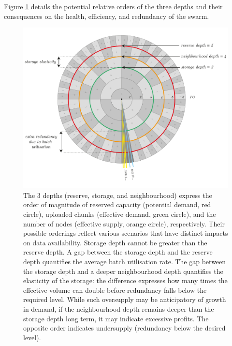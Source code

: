 Figure \ref{fig:depths} details the potential relative orders of the three depths and their consequences on the health, efficiency, and redundancy of the swarm.

\begin{figure}[!ht]
  \centering
    \includegraphics[width=.9\textwidth]{fig/depths-2.pdf}
  \caption[Depths]{The 3 depths (reserve, storage, and neighbourhood) express the order of magnitude of reserved capacity (potential demand, red circle), uploaded chunks (effective demand, green circle), and the number of nodes (effective supply, orange circle), respectively. Their possible orderings reflect various scenarios that have distinct impacts on data availability. Storage depth cannot be greater than the reserve depth. A gap between the storage depth and the reserve depth quantifies the average batch utilisation rate. The gap between the storage depth and a deeper neighbourhood depth quantifies the elasticity of the storage: the difference expresses how many times the effective volume can double before redundancy falls below the required level. While such oversupply may be anticipatory of growth in demand, if the neighbourhood depth remains deeper than the storage depth long term, it may indicate excessive profits. The opposite order indicates undersupply (redundancy below the desired level).}
\label{fig:depths}
\end{figure}    


